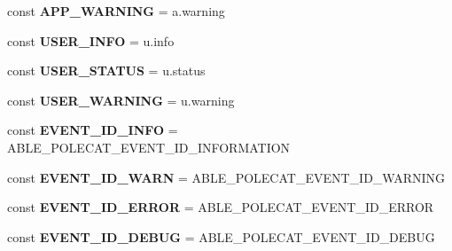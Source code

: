 \begin{DoxyCompactItemize}
\item 
\hypertarget{interface_able_polecat___log_interface_a24d893b2bb6866471f13f26fab9c17ae}{}const {\bfseries A\+P\+P\+\_\+\+W\+A\+R\+N\+I\+N\+G} = \textquotesingle{}a.\+warning\textquotesingle{}\label{interface_able_polecat___log_interface_a24d893b2bb6866471f13f26fab9c17ae}

\item 
\hypertarget{interface_able_polecat___log_interface_a3ad2020ea851ee2b4e76c01127f9e5a1}{}const {\bfseries U\+S\+E\+R\+\_\+\+I\+N\+F\+O} = \textquotesingle{}u.\+info\textquotesingle{}\label{interface_able_polecat___log_interface_a3ad2020ea851ee2b4e76c01127f9e5a1}

\item 
\hypertarget{interface_able_polecat___log_interface_ae59af0d8c291d5932fffa03a7b40f780}{}const {\bfseries U\+S\+E\+R\+\_\+\+S\+T\+A\+T\+U\+S} = \textquotesingle{}u.\+status\textquotesingle{}\label{interface_able_polecat___log_interface_ae59af0d8c291d5932fffa03a7b40f780}

\item 
\hypertarget{interface_able_polecat___log_interface_a4682692b163ab99c6286e55dbe1ae1d3}{}const {\bfseries U\+S\+E\+R\+\_\+\+W\+A\+R\+N\+I\+N\+G} = \textquotesingle{}u.\+warning\textquotesingle{}\label{interface_able_polecat___log_interface_a4682692b163ab99c6286e55dbe1ae1d3}

\item 
\hypertarget{interface_able_polecat___log_interface_a86132d9ddffb13dc70d31428226e4c3f}{}const {\bfseries E\+V\+E\+N\+T\+\_\+\+I\+D\+\_\+\+I\+N\+F\+O} = A\+B\+L\+E\+\_\+\+P\+O\+L\+E\+C\+A\+T\+\_\+\+E\+V\+E\+N\+T\+\_\+\+I\+D\+\_\+\+I\+N\+F\+O\+R\+M\+A\+T\+I\+O\+N\label{interface_able_polecat___log_interface_a86132d9ddffb13dc70d31428226e4c3f}

\item 
\hypertarget{interface_able_polecat___log_interface_a3a71219d70fd8cc16d61921ca798e8ed}{}const {\bfseries E\+V\+E\+N\+T\+\_\+\+I\+D\+\_\+\+W\+A\+R\+N} = A\+B\+L\+E\+\_\+\+P\+O\+L\+E\+C\+A\+T\+\_\+\+E\+V\+E\+N\+T\+\_\+\+I\+D\+\_\+\+W\+A\+R\+N\+I\+N\+G\label{interface_able_polecat___log_interface_a3a71219d70fd8cc16d61921ca798e8ed}

\item 
\hypertarget{interface_able_polecat___log_interface_acd6e04a79c6dd6bca0ecc0f6cb4ad48b}{}const {\bfseries E\+V\+E\+N\+T\+\_\+\+I\+D\+\_\+\+E\+R\+R\+O\+R} = A\+B\+L\+E\+\_\+\+P\+O\+L\+E\+C\+A\+T\+\_\+\+E\+V\+E\+N\+T\+\_\+\+I\+D\+\_\+\+E\+R\+R\+O\+R\label{interface_able_polecat___log_interface_acd6e04a79c6dd6bca0ecc0f6cb4ad48b}

\item 
\hypertarget{interface_able_polecat___log_interface_a4b09365540b986073a8199eab63a684c}{}const {\bfseries E\+V\+E\+N\+T\+\_\+\+I\+D\+\_\+\+D\+E\+B\+U\+G} = A\+B\+L\+E\+\_\+\+P\+O\+L\+E\+C\+A\+T\+\_\+\+E\+V\+E\+N\+T\+\_\+\+I\+D\+\_\+\+D\+E\+B\+U\+G\label{interface_able_polecat___log_interface_a4b09365540b986073a8199eab63a684c}

\end{DoxyCompactItemize}
